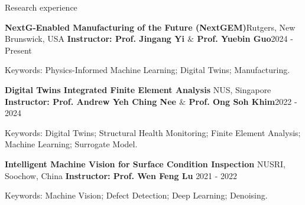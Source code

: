 \documentclass{resume} %
\begin{document}
\begin{rSection}{Research experience}
\begin{rSubsection}{\bf NextG-Enabled Manufacturing of the Future (NextGEM)}{Rutgers, New Brunswick, USA}
	{\bf Instructor: Prof. Jingang Yi $\&$  Prof. Yuebin Guo}{2024 - Present}
	\item {Keywords: Physics-Informed Machine Learning; Digital Twins; Manufacturing.}\\
\end{rSubsection}

\begin{rSubsection}{\bf Digital Twins Integrated Finite Element Analysis  }{NUS, Singapore}
	{\bf Instructor: Prof. Andrew Yeh Ching Nee $\&$  Prof. Ong Soh Khim}{2022 - 2024}
	\item {Keywords: Digital Twins; Structural Health Monitoring; Finite Element Analysis; Machine Learning; Surrogate Model.}\\
\end{rSubsection}

\begin{rSubsection}{\bf Intelligent Machine Vision for Surface Condition Inspection  }{NUSRI, Soochow, China}
{\bf Instructor: Prof. Wen Feng Lu  }{2021 - 2022}
	\item {Keywords: Machine Vision; Defect Detection; Deep Learning; Denoising.}\\
\end{rSubsection}

%
%
\end{rSection}
\end{document}
